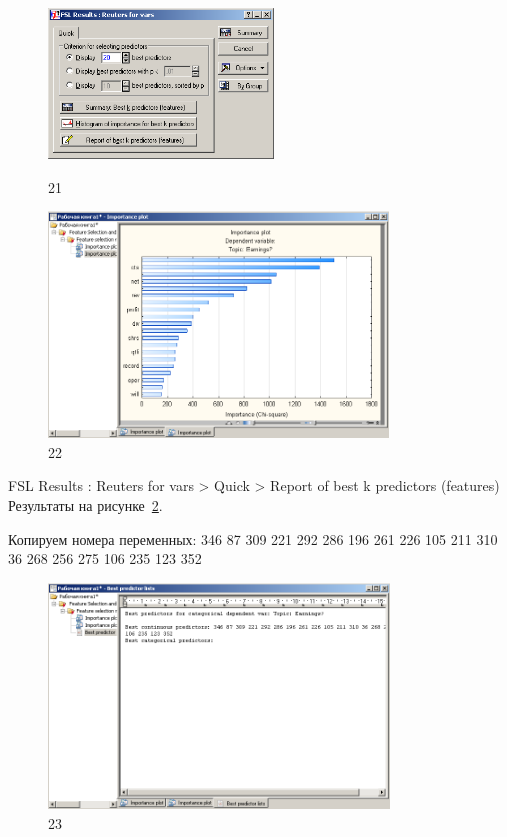 \begin{figure}[!h]
  \centering

  \begin{minipage}{0.29\textwidth}
    \centering

    \includegraphics[height=4cm]
    {inc/var5/21.PNG}

    \caption{21}

    \label{fig:var5_21}
  \end{minipage}
  \begin{minipage}{0.69\textwidth}
    \centering

    \includegraphics[height=6cm]
    {inc/var5/22.PNG}

    \caption{22}

    \label{fig:var5_22}
  \end{minipage}
\end{figure}

\newpage

FSL Results : Reuters for vars > Quick > Report of best k predictors (features) \\

Результаты на рисунке~\ref{fig:var5_23}.

Копируем номера переменных:
346 87 309 221 292 286 196 261 226 105 211 310 36 268 256 275 106 235 123 352

\begin{figure}[!h]
  \centering

  \includegraphics[height=6cm]
  {inc/var5/23.PNG}

  \caption{23}

  \label{fig:var5_23}
\end{figure}

